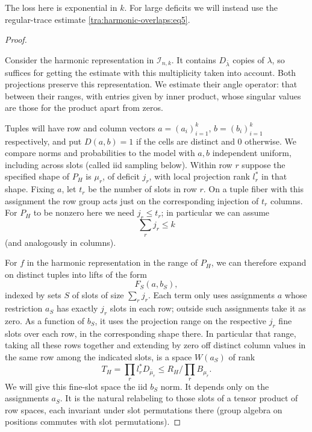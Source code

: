 The loss here is exponential in \(k\). For large deficits we will instead use the regular-trace estimate \eqref{tra:harmonic-overlaps:eq5}.

\begin{proof}\label{tra:harmonic-overlaps:sparse-overlap-proof}

\label{tra:harmonic-overlaps:fine-slot-expansion}
Consider the harmonic representation in \(\mathcal I_{n,k}\). It contains \(D_{\bar\lambda}\) copies of \(\lambda\), so suffices for getting the estimate with this multiplicity taken into account. Both projections preserve this representation. We estimate their angle operator: that between their ranges, with entries given by inner product, whose singular values are those for the product apart from zeros.

Tuples will have row and column vectors \(a=(a_i)_{i=1}^k\), \(b=(b_i)_{i=1}^k\) respectively, and put \(D(a,b)=1\) if the cells are distinct and 0 otherwise. We compare norms and probabilities to the model with \(a,b\) independent uniform, including across slots (called iid sampling below). Within row \(r\) suppose the specified shape of \(P_H\) is \(\mu_r\), of deficit \(j_r\), with local projection rank \(l_r^*\) in that shape. Fixing \(a\), let \(t_r\) be the number of slots in row \(r\). On a tuple fiber with this assignment the row group acts just on the corresponding injection of \(t_r\) columns. For \(P_H\) to be nonzero here we need \(j_r\le t_r\); in particular we can assume
\begin{equation}
                                \sum_r j_r\le k                           \label{tra:harmonic-overlaps:eq14}
\end{equation}
(and analogously in columns).

For \(f\) in the harmonic representation in the range of \(P_H\), we can therefore expand on distinct tuples into lifts of the form
\begin{equation}
                                  F_S(a,b_S),                             \label{tra:harmonic-overlaps:eq15}
\end{equation}
indexed by sets \(S\) of slots of size \(\sum_r j_r\). Each term only uses assignments \(a\) whose restriction \(a_S\) has exactly \(j_r\) slots in each row; outside such assignments take it as zero. As a function of \(b_S\), it uses the projection range on the respective \(j_r\) fine slots over each row, in the corresponding shape there. In particular that range, taking all these rows together and extending by zero off distinct column values in the same row among the indicated slots, is a space \(W(a_S)\) of rank
\begin{equation}
                 T_H=\prod_r l_r^* D_{\bar\mu_r}
                         \le R_H \Big/\prod_r B_{\mu_r}.                  \label{tra:harmonic-overlaps:eq16}
\end{equation}
We will give this fine-slot space the iid \(b_S\) norm. It depends only on the assignments \(a_S\). It is the natural relabeling to those slots of a tensor product of row spaces, each invariant under slot permutations there (group algebra on positions commutes with slot permutations).


\end{proof}
